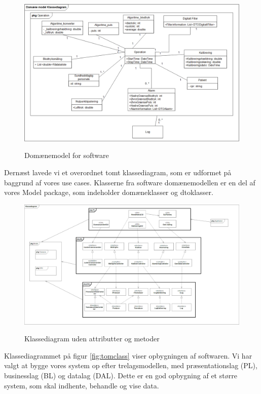 \begin{figure}[h!]
	\centering
	\includegraphics[width=1\linewidth]{Arkitektur_og_design/Softwarearkitektur/classdomain}
	\label{fig:classdomain}
	\caption{Domænemodel for software}
\end{figure}



Dernæst lavede vi et overordnet tomt klassediagram, som er udformet på baggrund af vores use cases. Klasserne fra software domænemodellen er en del af vores Model package, som indeholder domæneklasser og dtoklasser. 

\clearpage

\begin{figure}[h!]
	\centering
	\includegraphics[width=1\linewidth]{Arkitektur_og_design/Softwarearkitektur/tomclass}
	\label{fig:tomclass}
	\caption{Klassediagram uden attributter og metoder}
\end{figure}

Klassediagrammet på figur \vref{fig:tomclass} viser opbygningen af softwaren. Vi har valgt at bygge vores system op efter trelagsmodellen, med præsentationslag (PL), businesslag (BL) og datalag (DAL). Dette er en god opbygning af et større system, som skal indhente, behandle og vise data.

